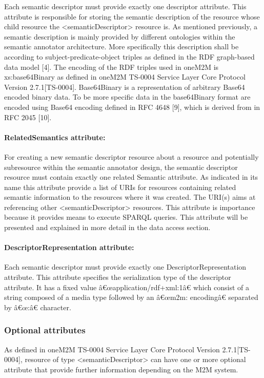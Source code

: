 Each semantic descriptor must provide exactly one descriptor attribute. This attribute is responsible for storing the semantic description of the resource whose child resource the <semanticDescriptor> resource is. As mentioned previously, a semantic description is mainly provided by different ontologies within the semantic annotator architecture. More specifically this description shall be according to subject-predicate-object triples as defined in the RDF graph-based data model [4]. The encoding of the RDF triples used in oneM2M is xs:base64Binary as defined in oneM2M TS-0004 Service Layer Core Protocol Version 2.7.1[TS-0004]. Base64Binary is a representation of arbitrary Base64 encoded binary data. To be more specific data in the base64Binary format are encoded using Base64 encoding defined in RFC 4648 [9], which is derived from in RFC 2045 [10].
\paragraph*{RelatedSemantics attribute:}

For creating a new semantic descriptor resource about a resource and potentially subresource within the semantic annotator design, the semantic descriptor resource must contain exactly one related Semantic attribute. As indicated in its name this attribute provide a list of URIs for resources containing related semantic information to the resources where it was created. The URI(s) aims at referencing other <semanticDescriptor> resources. This attribute is importance because it provides means to execute SPARQL queries. This attribute will be presented and explained in more detail in the data access section.
\paragraph*{DescriptorRepresentation attribute:}

Each semantic descriptor must provide exactly one DescriptorRepresentation attribute. This attribute specifies the serialization type of the descriptor attribute. It has a fixed value â€œapplication/rdf+xml:1â€  which consist of a string composed of a media type followed by an â€œm2m: encodingâ€ separated by â€œ:â€ character. 
\subsubsection{Optional attributes}
As defined in oneM2M TS-0004 Service Layer Core Protocol Version 2.7.1[TS-0004], resource of type <semanticDescriptor> can have one or more optional attribute that provide further information depending on the M2M system.
